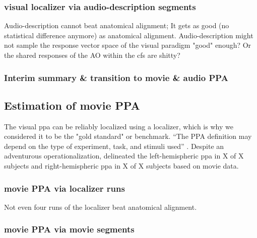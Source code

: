 \subsubsection{visual localizer via audio-description segments}

Audio-description cannot beat anatomical alignment;
%
It gets as good (no statistical difference anymore) as anatomical alignment.
%
Audio-description might not sample the response vector space of the visual
paradigm "good" enough?
%
Or the shared responses of the AO within the \ac{cfs} are shitty?


\subsubsection{Interim summary \& transition to movie \& audio PPA}





\subsection{Estimation of movie PPA}


The visual \ac{ppa} can be reliably localized using a localizer, which is why we
considered it to be the "gold standard" or benchmark.
%
``The PPA definition may depend on the type of experiment, task, and stimuli
used'' \citep{weiner2018defining}.
Despite an adventurous operationalization, \citet{haeusler2022processing}
delineated the left-hemispheric \ac{ppa} in X of X subjects and
right-hemispheric \ac{ppa} in X of X subjects based on movie data.


\subsubsection{movie PPA via localizer runs}

Not even four runs of the localizer beat anatomical alignment.


\subsubsection{movie PPA via movie segments}

